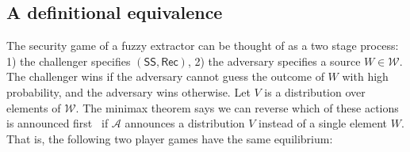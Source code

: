 \documentclass[11pt]{article}
\newcommand{\class}[1]{{\ensuremath{\mathsf{#1}}}}
\newcommand{\sketch}{\ensuremath{\class{SS}}\xspace}
\newcommand{\rec}{\ensuremath{\class{Rec}}\xspace}
\begin{document}
\subsection{A definitional equivalence}
\label{sec:def equiv}

The security game of a fuzzy extractor can be thought of as a two stage process: 1) the challenger specifies $(\sketch, \rec)$, 2) the adversary specifies a source $W\in \mathcal{W}$.  The challenger wins if the adversary cannot guess the outcome of $W$ with high probability, and the adversary wins otherwise.  Let $V$ is a distribution over elements of $\mathcal{W}$.  The minimax theorem says we can reverse which of these actions is announced first~\cite{neumann1928theorie} if $\mathcal{A}$ announces a distribution $V$ instead of a single element $W$.  That is, the following two player games have the same equilibrium:

\end{document}
